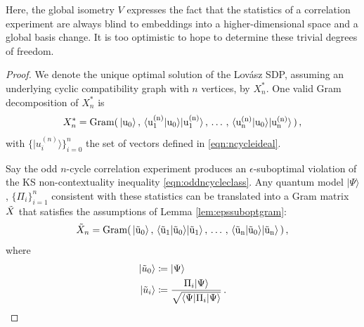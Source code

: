 Here, the global isometry $V$ expresses the fact that the statistics of a correlation experiment are always blind to embeddings into a higher-dimensional space and a global basis change. It is too optimistic to hope to determine these trivial degrees of freedom. 

\begin{proof} We denote the unique optimal solution of the Lovász SDP, assuming an underlying cyclic compatibility graph with $n$ vertices, by $X^*_n$. One valid Gram decomposition of $X^*_n$ is
\begin{equation*}
X^*_n=\operatorname{Gram(\thinspace\vert u_0\rangle\thinspace,\thinspace \langle u_1^{(n)}\vert u_0 \rangle \vert u_1^{(n)}\rangle\thinspace,\thinspace \dots\thinspace,\thinspace \langle u_n^{(n)}\vert u_0\rangle \vert u_n^{(n)}\rangle\thinspace)}\thinspace,
\end{equation*}
with $\{\vert u_i^{(n)} \rangle \}_{i=0}^n$ the set of vectors defined in \ref{eqn:ncycleideal}.

Say the odd $n$-cycle correlation experiment produces an $\epsilon$-suboptimal violation of the KS non-contextuality inequality \ref{eqn:oddncycleclass}. Any quantum model $\vert \Psi \rangle$, $\{\Pi_i\}_{i=1}^n$ consistent with these statistics can be translated into a Gram matrix $\Tilde{X}$ that satisfies the assumptions of Lemma \ref{lem:epssuboptgram}:
\begin{equation*}
\Tilde{X}_n=\operatorname{Gram(\thinspace\vert \Tilde{u}_0\rangle\thinspace,\thinspace \langle \Tilde{u}_1\vert \Tilde{u}_0 \rangle \vert \Tilde{u}_1\rangle\thinspace,\thinspace \dots\thinspace,\thinspace \langle \Tilde{u}_n\vert \Tilde{u}_0\rangle \vert \Tilde{u}_n\rangle\thinspace)}\thinspace,
\end{equation*}
where 
\begin{align*}
    \vert \Tilde{u}_0 \rangle & \coloneqq \vert \Psi \rangle\\
    \vert  \Tilde{u}_i \rangle & \coloneqq \frac{\Pi_i \vert \Psi \rangle}{\sqrt{\langle \Psi \vert \Pi_i \vert \Psi \rangle}}\,.
\end{align*}


\end{proof}
